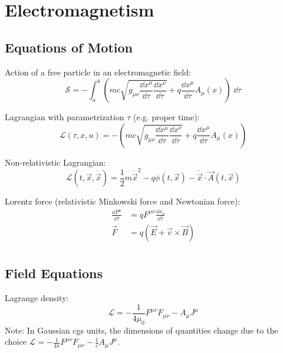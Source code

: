 \section{Electromagnetism}
	\subsection{Equations of Motion}
		\noindent
		Action of a free particle in an electromagnetic field:
		\begin{equation}
			\mathcal{S}=-\int_{a}^{b}\left(mc\sqrt{g_{\mu\nu}\frac{\dd x^\mu}{\dd \tau}\frac{\dd x^\nu}{\dd \tau}}
	+ q\frac{\dd x^\mu}{\dd \tau}A_\mu(x)\right)\;\dd\tau
		\end{equation}

		\noindent
		Lagrangian with parametrization $\tau$ (e.g. proper time):
		\begin{equation}
			\mathcal{L} (\tau,x,u) =-\left(mc\sqrt{g_{\mu\nu}\frac{\dd x^\mu}{\dd \tau}\frac{\dd x^\nu}{\dd \tau}}
			+ q\frac{\dd x^\mu}{\dd \tau}A_\mu(x)\right)
		\end{equation}

		\noindent
		Non-relativistic Lagrangian:
		\begin{equation}
			\mathcal{L}(t,\vec{x},\dot{\vec{x}}) = \frac{1}{2}m\dot{\vec{x}}^2 - q\phi(t,\vec{x}) - \dot{\vec{x}}\cdot\vec{A}(t,\vec{x})
		\end{equation}

		\noindent
		Lorentz force (relativistic Minkowski force and Newtonian force):
		\begin{equation}
			\begin{aligned}
				\frac{\dd P^\mu}{\dd \tau} &= q F^{\mu\nu}\frac{\dd x_\nu}{\dd \tau} \\
				\vec{F} &= q\left(\vec{E}+\vec{v}\times\vec{B}\right) \\
			\end{aligned}
		\end{equation}

	\subsection{Field Equations}
		\noindent
		Lagrange density:
		\begin{equation}
			\mathcal{L} = -\frac{1}{4\mu_0}F^{\mu\nu} F_{\mu\nu} - A_\mu J^\mu
		\end{equation}
		Note: In Gaussian cgs units, the dimensions of quantities change due to the choice $\mathcal{L} = -\frac{1}{4\pi}F^{\mu\nu} F_{\mu\nu} - \frac{1}{c}A_\mu J^\mu$.

